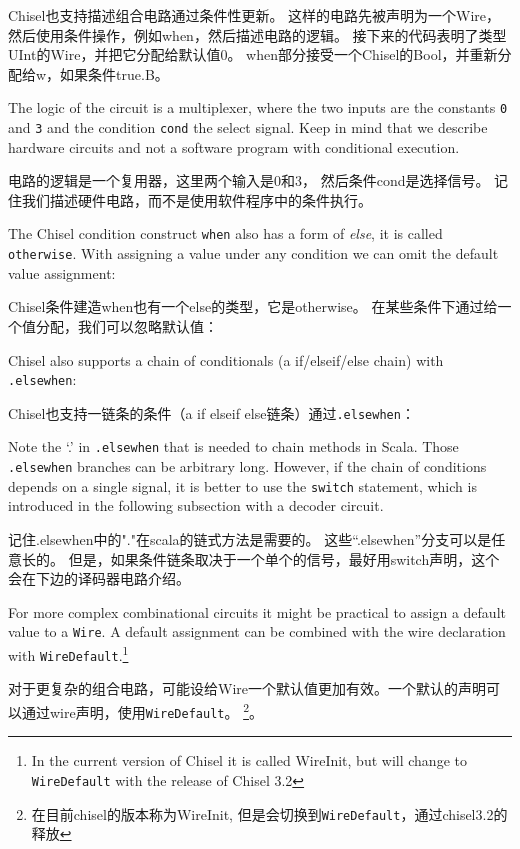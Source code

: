 \documentclass[%
    10pt,
    headinclude, footexclude,
    openright, %
    notitlepage,
    cleardoubleempty,
    headsepline,
    pointlessnumbers,
    bibtotoc, idxtotoc,
    ]{scrbook}
\newcommand{\code}[1]{{\small{\texttt{#1}}}}
\begin{document}
Chisel也支持描述组合电路通过条件性更新。
这样的电路先被声明为一个Wire，然后使用条件操作，例如when，然后描述电路的逻辑。
接下来的代码表明了类型UInt的Wire，并把它分配给默认值0。
when部分接受一个Chisel的Bool，并重新分配给w，如果条件true.B。


\noindent The logic of the circuit is a multiplexer, where the two inputs are the constants
\code{0} and \code{3} and the condition \code{cond} the select signal.
Keep in mind that we describe hardware circuits and not a software program with conditional
execution.

电路的逻辑是一个复用器，这里两个输入是0和3， 然后条件cond是选择信号。
记住我们描述硬件电路，而不是使用软件程序中的条件执行。

The Chisel condition construct \code{when} also has a form of \emph{else}, it is called
\code{otherwise}. With assigning a value under any condition we can omit the default
value assignment:

Chisel条件建造when也有一个else的类型，它是otherwise。
在某些条件下通过给一个值分配，我们可以忽略默认值：


Chisel also supports a chain of conditionals (a if/elseif/else chain) with \code{.elsewhen}:

Chisel也支持一链条的条件（a if elseif else链条）通过\code{.elsewhen}：


Note the `.' in \code{.elsewhen} that is needed to chain methods in Scala.
Those \code{.elsewhen} branches can be arbitrary long.
However, if the chain of conditions depends on a single signal, it is better
to use the \code{switch} statement, which is introduced in the following
subsection with a decoder circuit.

记住.elsewhen中的"."在scala的链式方法是需要的。
这些“.elsewhen”分支可以是任意长的。
但是，如果条件链条取决于一个单个的信号，最好用switch声明，这个会在下边的译码器电路介绍。

For more complex combinational circuits it might be practical to assign
a default value to a \code{Wire}. A default assignment can be combined with the wire
declaration with \code{WireDefault}.\footnote{In the current version of Chisel
it is called WireInit, but will change to \code{WireDefault} with the release of Chisel 3.2}

对于更复杂的组合电路，可能设给Wire一个默认值更加有效。一个默认的声明可以通过wire声明，使用\code{WireDefault}。
\footnote{在目前chisel的版本称为WireInit, 但是会切换到\code{WireDefault}，通过chisel3.2的释放}。
\end{document}
